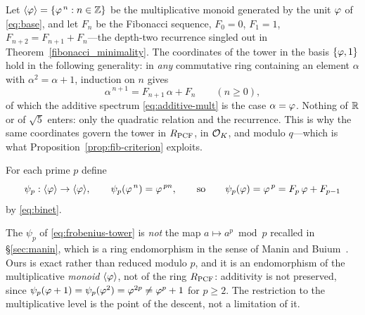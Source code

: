 \begin{definition}\label{def:golden-monoid}
Let $\langle\varphi\rangle=\{\varphi^{\,n}:n\in\mathbb{Z}\}$ be the multiplicative monoid generated by the
unit $\varphi$ of \eqref{eq:base}, and let $F_n$ be the Fibonacci sequence, $F_0=0$, $F_1=1$,
$F_{n+2}=F_{n+1}+F_n$---the depth-two recurrence singled out in Theorem~\ref{fibonacci_minimality}. The
coordinates of the tower in the basis $\{\varphi,1\}$ hold in the following generality: in
\emph{any} commutative ring containing an element $\alpha$ with $\alpha^{2}=\alpha+1$, induction
on $n$ gives
\begin{equation}\label{eq:binet}
  \alpha^{\,n+1}=F_{n+1}\,\alpha+F_n\qquad(n\ge0),
\end{equation}
of which the additive spectrum \eqref{eq:additive-mult} is the case $\alpha=\varphi$.
Nothing of $\mathbb{R}$ or of $\sqrt5$ enters: only the quadratic relation and the recurrence. This is
why the same coordinates govern the tower in $R_{\mathrm{PCF}}$, in $\mathcal{O}_K$, and modulo $q$---which is what
Proposition~\ref{prop:fib-criterion} exploits.

\end{definition}

\begin{definition}\label{def:frobenius}
For each prime $p$ define
\begin{equation}\label{eq:frobenius-tower}
  \psi_p:\langle\varphi\rangle\to\langle\varphi\rangle,\qquad
  \psi_p(\varphi^{\,n})=\varphi^{\,pn},
  \qquad\text{so}\qquad
  \psi_p(\varphi)=\varphi^{\,p}=F_p\,\varphi+F_{p-1}
\end{equation}
by \eqref{eq:binet}.

\end{definition}

\begin{remark}\label{rmk:psi-two}
The $\psi_p$ of \eqref{eq:frobenius-tower} is \emph{not} the map $a\mapsto a^{p}\bmod p$ recalled in
\S\ref{sec:manin}, which is a ring endomorphism in the sense of Manin and Buium~\cite{manin13,buium05}.
Ours is exact rather than reduced modulo $p$, and it is an endomorphism of the multiplicative
\emph{monoid} $\langle\varphi\rangle$, not of the ring $R_{\mathrm{PCF}}$: additivity is not preserved, since
$\psi_p(\varphi+1)=\psi_p(\varphi^{2})=\varphi^{2p}\neq\varphi^{p}+1$ for $p\ge2$. The restriction to
the multiplicative level is the point of the descent, not a limitation of it.
\end{remark}

